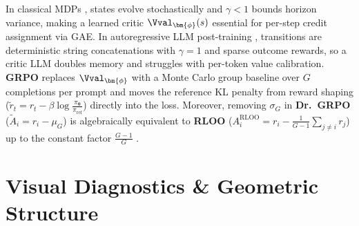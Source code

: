\documentclass[../../../../master.tex]{subfiles}
\begin{document}
\begin{crossbook}
In classical MDPs  , states evolve stochastically and $\gamma < 1$ bounds horizon variance, making a learned critic $\Vval_{\bm{\phi}}(s)$ essential for per-step credit assignment via GAE. In autoregressive LLM post-training , transitions are deterministic string concatenations with $\gamma = 1$ and sparse outcome rewards, so a critic LLM doubles memory and struggles with per-token value calibration. \textbf{GRPO} replaces $\Vval_{\bm{\phi}}$ with a Monte Carlo group baseline over $G$ completions per prompt and moves the reference KL penalty from reward shaping ($\tilde{r}_t = r_t - \beta \log \frac{\pi_{\bm{\theta}}}{\pi_{\mathrm{ref}}}$) directly into the loss. Moreover, removing $\sigma_G$ in \textbf{Dr.\ GRPO} ($\tilde{A}_i = r_i - \mu_G$) is algebraically equivalent to \textbf{RLOO} ($A_i^{\mathrm{RLOO}} = r_i - \frac{1}{G-1}\sum_{j \ne i} r_j$) up to the constant factor $\frac{G-1}{G}$ .
\end{crossbook}

\section{Visual Diagnostics \& Geometric Structure}\label{sec:pg:visuals}
\end{document}
